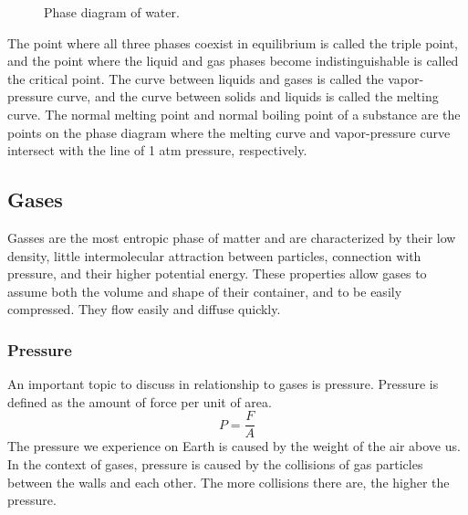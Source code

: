 \begin{figure}[ht]
    \caption{Phase diagram of water.}
    \label{fig:phase_diagram}
\end{figure}
The point where all three phases coexist in equilibrium is called the triple point, and the point where the liquid and gas phases become indistinguishable is called the critical point. The curve between liquids and gases is called the vapor-pressure curve, and the curve between solids and liquids is called the melting curve. The normal melting point and normal boiling point of a substance are the points on the phase diagram where the melting curve and vapor-pressure curve intersect with the line of 1 atm pressure, respectively.
\subsection{Gases}
Gasses are the most entropic phase of matter and are characterized by their low density, little intermolecular attraction between particles, connection with pressure, and their higher potential energy. These properties allow gases to assume both the volume and shape of their container, and to be easily compressed. They flow easily and diffuse quickly. 
\subsubsection{Pressure}
An important topic to discuss in relationship to gases is pressure. Pressure is defined as the amount of force per unit of area.
\begin{equation}\label{eq:pressure}
    P = \frac{F}{A}
\end{equation}
The pressure we experience on Earth is caused by the weight of the air above us. In the context of gases, pressure is caused by the collisions of gas particles between the walls and each other. The more collisions there are, the higher the pressure. 

